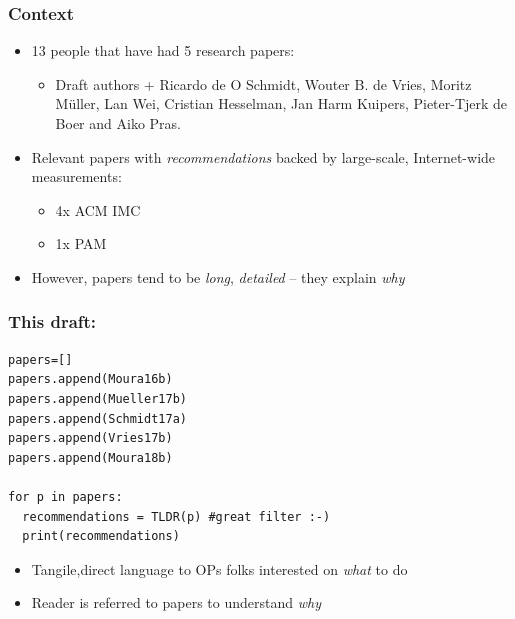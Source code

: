 \documentclass[11pt,show 
notes,notheorems,noamsthm,blank]{beamer} %
\begin{document}
\begin{frame}
 \frametitle{Context}
 
 \begin{itemize}

  \item 13 people that have had 5  research papers:
  \begin{itemize}
   \item \footnotesize Draft authors + Ricardo de O Schmidt, Wouter B. de 
Vries, Moritz M\"{u}ller, Lan Wei,  Cristian Hesselman, Jan Harm Kuipers, 
Pieter-Tjerk de Boer and Aiko  Pras.
  \end{itemize}

 \item Relevant papers with \textit{recommendations} backed by 
large-scale, Internet-wide measurements: 
\begin{itemize}
 \item 4x ACM IMC
 \item 1x PAM
\end{itemize}


\item However, papers tend to be \textit{long}, \textit{detailed} -- they 
explain \textit{why} 

 \end{itemize}

\end{frame}



\begin{frame}[fragile]
 \frametitle{\textbf{This draft:}}
 
 

 \lstset{language=Python}
 \lstset{frame=lines}
  \lstset{basicstyle=\footnotesize}
  
  
\begin{lstlisting}
papers=[]
papers.append(Moura16b)
papers.append(Mueller17b)
papers.append(Schmidt17a)
papers.append(Vries17b)
papers.append(Moura18b)

for p in papers:
  recommendations = TLDR(p) #great filter :-)
  print(recommendations)
\end{lstlisting}

\begin{itemize}
 \item Tangile,direct language to OPs folks interested on \textit{what} to do
 \item Reader is referred to papers to understand \textit{why}
\end{itemize}


\end{frame}
\end{document}
